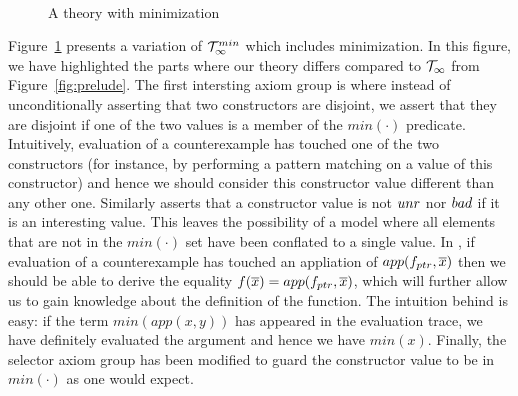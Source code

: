 \begin{figure}
{\[\begin{array}{c}
\begin{array}{lll}
\end{array}
\end{array}\]}
\caption{A theory with minimization}\label{fig:min-theory}
\end{figure}

Figure~\ref{fig:min-theory} presents a variation of ${\cal T}_\infty^{min}$ which includes minimization.
In this figure, we have highlighted the parts where our theory differs compared to ${\cal T}_\infty$ from
Figure~\ref{fig:prelude}. The first intersting axiom group is  where instead of 
unconditionally asserting that two constructors are disjoint, we assert that they are disjoint if
one of the two values is a member of the $min(\cdot)$ predicate. Intuitively, evaluation of a 
counterexample has touched one of the two constructors (for instance, by performing a pattern matching
on a value of this constructor) and hence we should consider this constructor value different than any 
other one. Similarly  asserts that a constructor value is not $\mathop{unr}$ nor $\mathop{bad}$ if 
it is an interesting value. This leaves the possibility of a model where all elements that are not in 
the $min(\cdot)$ set have been conflated to a single value. In , if evaluation of a counterexample
has touched an appliation of $app(f_{ptr},\overline{x})$ then we should be able to derive the equality 
$f(\overline{x}) = app(f_{ptr},\overline{x})$, which will further allow us to gain knowledge about the definition of the function.
The intuition behind  is easy: if the term $min(app(x,y))$ has appeared in the evaluation trace, 
we have definitely evaluated the argument and hence we have $min(x)$. Finally, the selector axiom group 
has been modified to guard the constructor value to be in $min(\cdot)$ as one would expect. 


